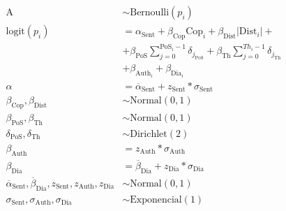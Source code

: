 \documentclass[a4paper, 12pt, article]{memoir}
\newcommand{\Bernoulli}{\text{Bernoulli}}
\newcommand{\Normal}{\text{Normal}}
\newcommand{\Dirichlet}{\text{Dirichlet}}
\newcommand{\Exponencial}{\text{Exponencial}}
\newcommand{\logit}{\text{logit}}
\newcommand{\Dist}{\text{Dist}}
\newcommand{\Cop}{\text{Cop}}
\newcommand{\Sent}{\text{Sent}}
\newcommand{\Auth}{\text{Auth}}
\newcommand{\PoS}{\text{PoS}}
\newcommand{\Th}{\text{Th}}
\newcommand{\Dia}{\text{Dia}}
\newcommand{\abar}{\overline{\alpha}}
\newcommand{\bbar}{\overline{\beta}}
\newcommand{\bv}[1]{\beta_\text{#1}}
\newcommand{\bvi}[1]{\beta_{\text{#1}_i}}
\begin{document}
\begin{align*}
  \text{A}                                                & \sim \Bernoulli(p_i)                                                                                       \\
  \logit(p_i)                                             & = \alpha_{\Sent} + \bv{Cop}\Cop_i + \bv{Dist}|\Dist_i| +                                                   \\
                                                          & + \bv{PoS}\sum^{\PoS_{i}-1}_{j=0}{\delta_{j_{\PoS}}}      + \bv{Th}\sum^{Th_{i}-1}_{j=0}{\delta_{j_{\Th}}} \\
                                                          & + \bvi{Auth} + \bvi{Dia}                                                                                   \\
  \alpha                                                  & = \abar_\Sent + z_{\Sent} * \sigma_\Sent                                                                   \\
  \bv{Cop}, \bv{Dist}                                     & \sim \Normal(0, 1)                                                                                         \\
  \bv{PoS}, \bv{Th}                                       & \sim \Normal(0, 1)                                                                                         \\
  \delta_{\PoS}, \delta_{\Th}                             & \sim \Dirichlet(2)                                                                                         \\
  \bv{Auth}                                               & = z_{\Auth}*\sigma_{\Auth}                                                                                 \\
  \bv{Dia}                                                & = \bbar_\Dia + z_{\Dia}*\sigma_{\Dia}                                                                      \\
  \abar_\Sent, \bbar_\Dia, z_{\Sent}, z_{\Auth}, z_{\Dia} & \sim \Normal(0,1)                                                                                          \\
  \sigma_{\Sent}, \sigma_{\Auth}, \sigma_{\Dia}           & \sim \Exponencial(1)
\end{align*}
\end{document}
